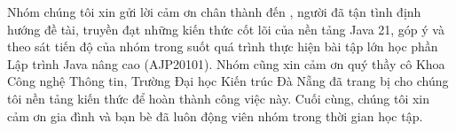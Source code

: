 \begin{acknowledgments}

Nhóm chúng tôi xin gửi lời cảm ơn chân thành đến \dauGVHD, người đã tận tình
định hướng đề tài, truyền đạt những kiến thức cốt lõi của nền tảng Java 21,
góp ý và theo sát tiến độ của nhóm trong suốt quá trình thực hiện bài tập lớn
học phần Lập trình Java nâng cao (AJP20101). Nhóm cũng xin cảm ơn quý thầy cô
Khoa Công nghệ Thông tin, Trường Đại học Kiến trúc Đà Nẵng đã trang bị cho
chúng tôi nền tảng kiến thức để hoàn thành công việc này. Cuối cùng, chúng tôi
xin cảm ơn gia đình và bạn bè đã luôn động viên nhóm trong thời gian học tập.

\vspace{1.4em}
\hfill{}

\end{acknowledgments}

